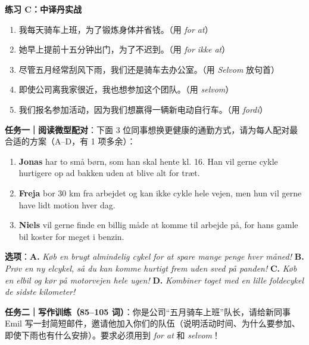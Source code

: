\textbf{练习 C：中译丹实战}
\begin{enumerate}
  \item 我每天骑车上班，为了锻炼身体并省钱。（用 \textit{for at}）
  \item 她早上提前十五分钟出门，为了不迟到。（用 \textit{for ikke at}）
  \item 尽管五月经常刮风下雨，我们还是骑车去办公室。（用 \textit{Selvom} 放句首）
  \item 即使公司离我家很近，我也想参加这个团队。（用 \textit{selvom}）
  \item 我们报名参加活动，因为我们想赢得一辆新电动自行车。（用 \textit{fordi}）
\end{enumerate}


\begin{tcolorbox}[enhanced, breakable, colback=NCDBgGray, colframe=NCDGray, coltitle=white, fonttitle=\bfseries, title={Modul 2 阅读与写作双项实战（Læsning Opgave 1 微型配对 + 同事邀请短邮）}, arc=2pt, boxrule=0.8pt, borderline west={3pt}{0pt}{NCDRed}, left=10pt, right=10pt, top=7pt, bottom=7pt]
\small
\textbf{任务一｜阅读微型配对}：下面 3 位同事想换更健康的通勤方式，请为每人配对最合适的方案（A--D，有 1 项多余）：
\begin{enumerate}
  \item \textbf{Jonas} har to små børn, som han skal hente kl. 16. Han vil gerne cykle hurtigere op ad bakken uden at blive alt for træt. \underline{\hspace{1.4cm}}
  \item \textbf{Freja} bor 30 km fra arbejdet og kan ikke cykle hele vejen, men hun vil gerne have lidt motion hver dag. \underline{\hspace{1.4cm}}
  \item \textbf{Niels} vil gerne finde en billig måde at komme til arbejde på, for hans gamle bil koster for meget i benzin. \underline{\hspace{1.4cm}}
\end{enumerate}
\textbf{选项}：\textbf{A.} \textit{Køb en brugt almindelig cykel for at spare mange penge hver måned!} \quad \textbf{B.} \textit{Prøv en ny elcykel, så du kan komme hurtigt frem uden sved på panden!} \quad \textbf{C.} \textit{Køb en elbil og kør på motorvejen hele ugen!} \quad \textbf{D.} \textit{Kombiner toget med en lille foldecykel de sidste kilometer!}

\vspace{0.35em}
\textbf{任务二｜写作训练（85--105 词）}：你是公司“五月骑车上班”队长，请给新同事 Emil 写一封简短邮件，邀请他加入你们的队伍（说明活动时间、为什么要参加、即使下雨也有什么安排）。要求必须用到 \textit{for at} 和 \textit{selvom}！
\end{tcolorbox}

